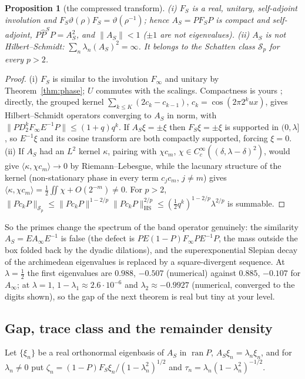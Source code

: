 \documentclass[11pt]{amsart}
\newtheorem{proposition}[theorem]{Proposition}
\theoremstyle{definition}
\theoremstyle{remark}
\newcommand{\ran}{\operatorname{ran}}
\newcommand{\Pih}{\widehat P}
\begin{document}
\begin{proposition}[the compressed transform]\label{prop:AS}
\emph{(i)} $F_S$ is a real, unitary, self-adjoint involution and $F_S\vartheta(\rho)F_S=\vartheta(\rho^{-1})$; hence
$A_S=PF_SP$ is compact and self-adjoint, $P\Pih^SP=A_S^2$, and $\|A_S\|<1$ ($\pm1$ are not eigenvalues).
\emph{(ii)} $A_S$ is not Hilbert--Schmidt: $\sum_n\lambda_n(A_S)^2=\infty$. It belongs to the Schatten class
$\mathcal S_p$ for every $p>2$.
\end{proposition}
\begin{proof}
(i) $F_S$ is similar to the involution $F_\infty$ and unitary by Theorem~\ref{thm:phase}; $U$ commutes with the scalings.
Compactness is yours \cite[Thms.~2.1, 4.4]{CCquasi}; directly, the grouped kernel $\sum_{k\le K}(2c_k-c_{k-1})$,
$c_k=\cos(2\pi2^kux)$, gives Hilbert--Schmidt operators converging to $A_S$ in norm, with
$\|PD_2^kF_\infty E^{-1}P\|\le(1+q)q^k$. If $A_S\xi=\pm\xi$ then $F_S\xi=\pm\xi$ is supported in $(0,\lambda]$, so
$E^{-1}\xi$ and its cosine transform are both compactly supported, forcing $\xi=0$.
(ii) If $A_S$ had an $L^2$ kernel $\kappa$, pairing with $\chi c_m$, $\chi\in C_c^\infty((\delta,\lambda-\delta)^2)$, would
give $\langle\kappa,\chi c_m\rangle\to0$ by Riemann--Lebesgue, while the lacunary structure of the kernel (non-stationary phase
in every term $c_jc_m$, $j\ne m$) gives $\langle\kappa,\chi c_m\rangle=\frac12\iint\chi+O(2^{-m})\ne0$. For $p>2$,
$\|Pc_kP\|_{\mathcal S_p}\le\|Pc_kP\|^{1-2/p}\|Pc_kP\|_{\mathrm{HS}}^{2/p}\le(\tfrac12q^k)^{1-2/p}\lambda^{2/p}$ is summable.
\end{proof}

So the primes change the spectrum of the band operator genuinely: the similarity $A_S=EA_\infty E^{-1}$ is false
(the defect is $PE(1-P)F_\infty PE^{-1}P$, the mass outside the box folded back by the dyadic dilations), and the
superexponential Slepian decay of the archimedean eigenvalues is replaced by a square-divergent sequence. At
$\lambda=\frac12$ the first eigenvalues are $0.988$, $-0.507$ (numerical) against $0.885$, $-0.107$ for $A_\infty$;
at $\lambda=1$, $1-\lambda_1\approx2.6\cdot10^{-6}$ and $\lambda_2\approx-0.9927$ (numerical, converged to the digits shown),
so the gap of the next theorem is real but tiny at your level.

\subsection{Gap, trace class and the remainder density}
Let $\{\xi_n\}$ be a real orthonormal eigenbasis of $A_S$ in $\ran P$, $A_S\xi_n=\lambda_n\xi_n$, and for $\lambda_n\ne0$
put $\zeta_n=(1-P)F_S\xi_n/(1-\lambda_n^2)^{1/2}$ and $\tau_n=\lambda_n(1-\lambda_n^2)^{-1/2}$.
\end{document}
